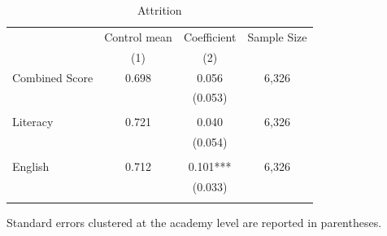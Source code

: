 \begin{table}[htbp]
  \centering
  \caption{Attrition}
  \begin{threeparttable}
    \begin{tabular}{rcrr}
    \toprule
    \toprule
          & \multicolumn{1}{l}{Control mean} & \multicolumn{1}{l}{Coefficient} & \multicolumn{1}{l}{Sample Size} \\
          & (1)   & \multicolumn{1}{c}{(2)} &  \\
    \midrule
    \multicolumn{1}{l}{Combined Score} & 0.698 & \multicolumn{1}{c}{0.056} & \multicolumn{1}{c}{6,326} \\
          &       & \multicolumn{1}{c}{(0.053)} &  \\
          &       &       &  \\
    \multicolumn{1}{l}{Literacy} & 0.721 & \multicolumn{1}{c}{0.040} & \multicolumn{1}{c}{6,326} \\
          &       & \multicolumn{1}{c}{(0.054)} &  \\
          &       &       &  \\
    \multicolumn{1}{l}{English} & 0.712 & \multicolumn{1}{c}{0.101***} & \multicolumn{1}{c}{6,326} \\
          &       & \multicolumn{1}{c}{(0.033)} &  \\
          &       &       &  \\
    \bottomrule
    \bottomrule
    \end{tabular}%
    \begin{tablenotes}
    \item Standard errors clustered at the academy level are reported in parentheses. 
    \end{tablenotes}

    \end{threeparttable}
    
  \label{tab:attrition}%
\end{table}%